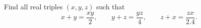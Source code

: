 Find all real triples $(x,y,z)$ such that
\[x+y=\dfrac{xy}{2},\qquad y+z=\dfrac{yz}{4},\qquad z+x=\dfrac{zx}{2.4}.\]
